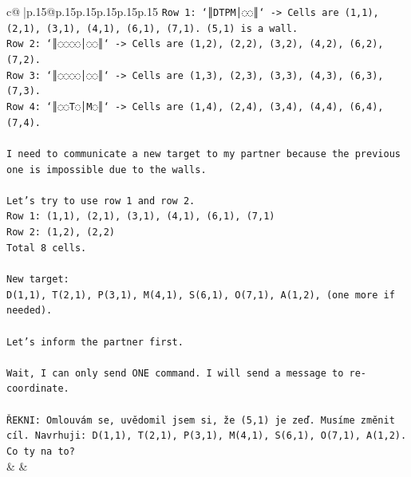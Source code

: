 \documentclass{article}
\begin{document}
{\begin{supertabular}{c@{$\;$}|p{.15\linewidth}@{}p{.15\linewidth}p{.15\linewidth}p{.15\linewidth}p{.15\linewidth}p{.15\linewidth}}
{{{\texttt{Row 1: `║DTPM│◌◌║` {-}> Cells are (1,1), (2,1), (3,1), (4,1), (6,1), (7,1). (5,1) is a wall.} \\
\texttt{Row 2: `║◌◌◌◌│◌◌║` {-}> Cells are (1,2), (2,2), (3,2), (4,2), (6,2), (7,2).} \\
\texttt{Row 3: `║◌◌◌◌│◌◌║` {-}> Cells are (1,3), (2,3), (3,3), (4,3), (6,3), (7,3).} \\
\texttt{Row 4: `║◌◌T◌│M◌║` {-}> Cells are (1,4), (2,4), (3,4), (4,4), (6,4), (7,4).} \\
\\ 
\texttt{I need to communicate a new target to my partner because the previous one is impossible due to the walls.} \\
\\ 
\texttt{Let's try to use row 1 and row 2.} \\
\texttt{Row 1: (1,1), (2,1), (3,1), (4,1), (6,1), (7,1)} \\
\texttt{Row 2: (1,2), (2,2)} \\
\texttt{Total 8 cells.} \\
\\ 
\texttt{New target:} \\
\texttt{D(1,1), T(2,1), P(3,1), M(4,1), S(6,1), O(7,1), A(1,2), (one more if needed).} \\
\\ 
\texttt{Let's inform the partner first.} \\
\\ 
\texttt{Wait, I can only send ONE command. I will send a message to re{-}coordinate.} \\
\\ 
\texttt{ŘEKNI: Omlouvám se, uvědomil jsem si, že (5,1) je zeď. Musíme změnit cíl. Navrhuji: D(1,1), T(2,1), P(3,1), M(4,1), S(6,1), O(7,1), A(1,2). Co ty na to?} \\
            }
        }
    }
    & & \\ \\


\end{supertabular}}
\end{document}
